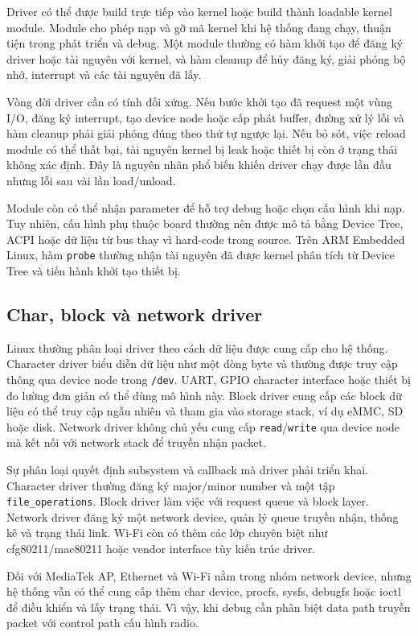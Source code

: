 \documentclass[11pt]{article}
\newcommand{\code}[1]{\texttt{#1}}
\begin{document}
Driver có thể được build trực tiếp vào kernel hoặc build thành loadable kernel module. Module cho phép nạp và gỡ mã kernel khi hệ thống đang chạy, thuận tiện trong phát triển và debug. Một module thường có hàm khởi tạo để đăng ký driver hoặc tài nguyên với kernel, và hàm cleanup để hủy đăng ký, giải phóng bộ nhớ, interrupt và các tài nguyên đã lấy.

Vòng đời driver cần có tính đối xứng. Nếu bước khởi tạo đã request một vùng I/O, đăng ký interrupt, tạo device node hoặc cấp phát buffer, đường xử lý lỗi và hàm cleanup phải giải phóng đúng theo thứ tự ngược lại. Nếu bỏ sót, việc reload module có thể thất bại, tài nguyên kernel bị leak hoặc thiết bị còn ở trạng thái không xác định. Đây là nguyên nhân phổ biến khiến driver chạy được lần đầu nhưng lỗi sau vài lần load/unload.

Module còn có thể nhận parameter để hỗ trợ debug hoặc chọn cấu hình khi nạp. Tuy nhiên, cấu hình phụ thuộc board thường nên được mô tả bằng Device Tree, ACPI hoặc dữ liệu từ bus thay vì hard-code trong source. Trên ARM Embedded Linux, hàm \code{probe} thường nhận tài nguyên đã được kernel phân tích từ Device Tree và tiến hành khởi tạo thiết bị.

\subsection{Char, block và network driver}

Linux thường phân loại driver theo cách dữ liệu được cung cấp cho hệ thống. Character driver biểu diễn dữ liệu như một dòng byte và thường được truy cập thông qua device node trong \code{/dev}. UART, GPIO character interface hoặc thiết bị đo lường đơn giản có thể dùng mô hình này. Block driver cung cấp các block dữ liệu có thể truy cập ngẫu nhiên và tham gia vào storage stack, ví dụ eMMC, SD hoặc disk. Network driver không chủ yếu cung cấp \code{read}/\code{write} qua device node mà kết nối với network stack để truyền nhận packet.

Sự phân loại quyết định subsystem và callback mà driver phải triển khai. Character driver thường đăng ký major/minor number và một tập \code{file\_operations}. Block driver làm việc với request queue và block layer. Network driver đăng ký một network device, quản lý queue truyền nhận, thống kê và trạng thái link. Wi-Fi còn có thêm các lớp chuyên biệt như cfg80211/mac80211 hoặc vendor interface tùy kiến trúc driver.

Đối với MediaTek AP, Ethernet và Wi-Fi nằm trong nhóm network device, nhưng hệ thống vẫn có thể cung cấp thêm char device, procfs, sysfs, debugfs hoặc ioctl để điều khiển và lấy trạng thái. Vì vậy, khi debug cần phân biệt data path truyền packet với control path cấu hình radio.
\end{document}
